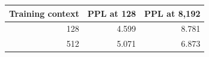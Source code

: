 \begin{tabular}{rrr}\toprule
Training context & PPL at 128 & PPL at 8,192\\\midrule
128 & 4.599 & 8.781 \\
512 & 5.071 & 6.873 \\
\bottomrule\end{tabular}
